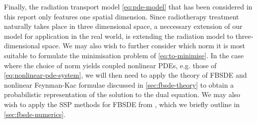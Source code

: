 Finally, the radiation transport model \autoref{eq:pde-model} that has been considered in this report only features one spatial dimension. Since radiotherapy treatment naturally takes place in three dimensional space, a neccessary extension of our model for application in the real world, is extending the radiation model to three-dimensional space. We may also wish to further consider which norm it is most suitable to formulate the minimisation problem of \autoref{eq:to-minimise}. In the case where the choice of norm yields coupled nonlinear PDEs, e.g. those of \autoref{eq:nonlinear-pde-system}, we will then need to apply the theory of FBSDE and nonlinear Feynman-Kac formulae discussed in \autoref{sec:fbsde-theory} to obtain a probabilistic representation of the solution to the dual equation. We may also wish to apply the SSP methods for FBSDE from \cite{fang2023strong}, which we briefly outline in \autoref{sec:fbsde-numerics}.